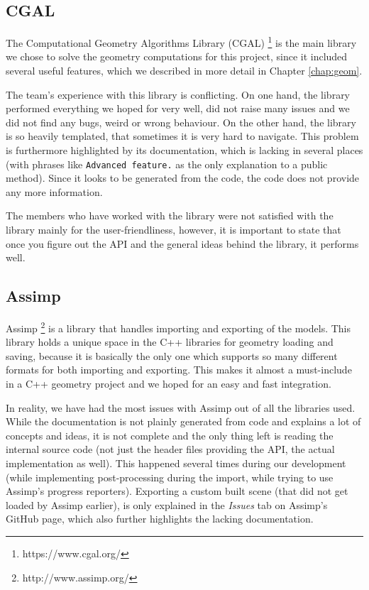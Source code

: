 \subsection{CGAL}

The Computational Geometry Algorithms Library (CGAL) \footnote{https://www.cgal.org/} is the main library we chose to solve the geometry computations for this project, since it included several useful features, which we described in more detail in Chapter \ref{chap:geom}.

The team's experience with this library is conflicting. On one hand, the library performed everything we hoped for very well, did not raise many issues and we did not find any bugs, weird or wrong behaviour. On the other hand, the library is so heavily templated, that sometimes it is very hard to navigate. This problem is furthermore highlighted by its documentation, which is lacking in several places (with phrases like \texttt{Advanced feature.} as the only explanation to a public method). Since it looks to be generated from the code, the code does not provide any more information.

The members who have worked with the library were not satisfied with the library mainly for the user-friendliness, however, it is important to state that once you figure out the API and the general ideas behind the library, it performs well.

\subsection{Assimp}

Assimp \footnote{http://www.assimp.org/} is a library that handles importing and exporting of the models. This library holds a unique space in the C++ libraries for geometry loading and saving, because it is basically the only one which supports so many different formats for both importing and exporting. This makes it almost a must-include in a C++ geometry project and we hoped for an easy and fast integration.

In reality, we have had the most issues with Assimp out of all the libraries used. While the documentation is not plainly generated from code and explains a lot of concepts and ideas, it is not complete and the only thing left is reading the internal source code (not just the header files providing the API, the actual implementation as well). This happened several times during our development (while implementing post-processing during the import, while trying to use Assimp's progress reporters). Exporting a custom built scene (that did not get loaded by Assimp earlier), is only explained in the \textit{Issues} tab on Assimp's GitHub page, which also further highlights the lacking documentation.

